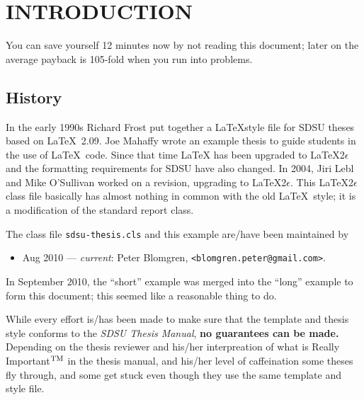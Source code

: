 %

\chapter{INTRODUCTION}
\label{chap:intro}

You can save yourself 12 minutes now by not reading this document;
later on the average payback is 105-fold when you run into problems.

\section{History}

In the early 1990s Richard Frost put together a \LaTeX style file for
SDSU theses based on \LaTeX~2.09.  Joe Mahaffy wrote an example thesis
to guide students in the use of \LaTeX\ code.  Since that time \LaTeX
has been upgraded to \LaTeX2$\epsilon$ and the formatting requirements
for SDSU have also changed.  In 2004, Jiri Lebl and Mike O'Sullivan
worked on a revision, upgrading to \LaTeX2$\epsilon$.  This
\LaTeX2$\epsilon$ class file basically has almost nothing in common
with the old \LaTeX\ style; it is a modification of the standard
report class.

The class file \verb+sdsu-thesis.cls+ and this example are/have been
maintained by
\begin{itemize}
\item Aug 2010 --- \emph{current}: Peter Blomgren,
  \verb+<blomgren.peter@gmail.com>+.
\end{itemize}

In September 2010, the ``short'' example was merged into the ``long''
example to form this document; this seemed like a reasonable thing to
do.

While every effort is/has been made to make sure that the template and
thesis style conforms to the \emph{SDSU Thesis Manual}, \textbf{no
guarantees can be made.}  Depending on the thesis reviewer and his/her
interpreation of what is Really Important$^{\hbox{\scriptsize TM}}$ in
the thesis manual, and his/her level of caffeination some theses fly
through, and some get stuck even though they use the same template and
style file.


